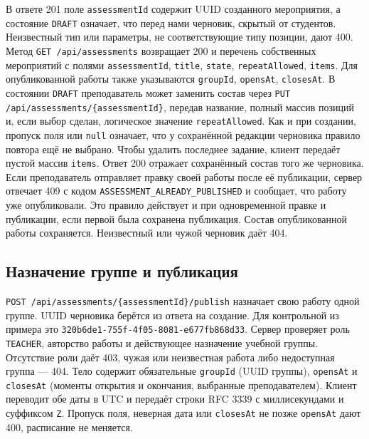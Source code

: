 \documentclass[12pt,a4paper]{article}
\begin{document}
В ответе 201 поле \texttt{assessment\allowbreak{}Id} содержит UUID созданного мероприятия, а состояние \texttt{DRAFT} означает, что перед нами черновик, скрытый от студентов. Неизвестный тип или параметры, не соответствующие типу позиции, дают 400. Метод \texttt{GET /\allowbreak{}api/\allowbreak{}assessments} возвращает 200 и перечень собственных мероприятий с полями \texttt{assessment\allowbreak{}Id}, \texttt{title}, \texttt{state}, \texttt{repeat\allowbreak{}Allowed}, \texttt{items}. Для опубликованной работы также указываются \texttt{groupId}, \texttt{opensAt}, \texttt{closesAt}. В состоянии \texttt{DRAFT} преподаватель может заменить состав через \texttt{PUT /\allowbreak{}api/\allowbreak{}assessments/\allowbreak{}\{assessment\allowbreak{}Id\}}, передав название, полный массив позиций и, если выбор сделан, логическое значение \texttt{repeat\allowbreak{}Allowed}. Как и при создании, пропуск поля или \texttt{null} означает, что у сохранённой редакции черновика правило повтора ещё не выбрано. Чтобы удалить последнее задание, клиент передаёт пустой массив \texttt{items}. Ответ 200 отражает сохранённый состав того же черновика. Если преподаватель отправляет правку своей работы после её публикации, сервер отвечает 409 с кодом \texttt{ASSESSMENT\_\allowbreak{}ALREADY\_\allowbreak{}PUBLISHED} и сообщает, что работу уже опубликовали. Это правило действует и при одновременной правке и публикации, если первой была сохранена публикация. Состав опубликованной работы сохраняется. Неизвестный или чужой черновик даёт 404.

\subsection{Назначение группе и публикация}\label{ux43dux430ux437ux43dux430ux447ux435ux43dux438ux435-ux433ux440ux443ux43fux43fux435-ux438-ux43fux443ux431ux43bux438ux43aux430ux446ux438ux44f}

\hypertarget{назначение-группе-и-публикация}{}

\texttt{POST /\allowbreak{}api/\allowbreak{}assessments/\allowbreak{}\{assessment\allowbreak{}Id\}/\allowbreak{}publish} назначает свою работу одной группе. UUID черновика берётся из ответа на создание. Для контрольной из примера это \texttt{320b6de1-\allowbreak{}755f-\allowbreak{}4f05-\allowbreak{}8081-\allowbreak{}e677fb868d33}. Сервер проверяет роль \texttt{TEACHER}, авторство работы и действующее назначение учебной группы. Отсутствие роли даёт 403, чужая или неизвестная работа либо недоступная группа --- 404. Тело содержит обязательные \texttt{groupId} (UUID группы), \texttt{opensAt} и \texttt{closesAt} (моменты открытия и окончания, выбранные преподавателем). Клиент переводит обе даты в UTC и передаёт строки RFC 3339 с миллисекундами и суффиксом \texttt{Z}. Пропуск поля, неверная дата или \texttt{closesAt} не позже \texttt{opensAt} дают 400, расписание не меняется.
\end{document}

